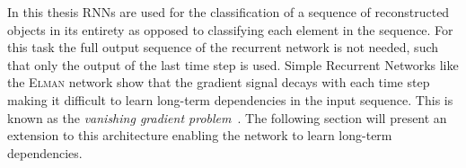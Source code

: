 In this thesis RNNs are used for the classification of a sequence of
reconstructed objects in its entirety as opposed to classifying each element in
the sequence. For this task the full output sequence of the recurrent network is
not needed, such that only the output of the last time step is used. Simple
Recurrent Networks like the \textsc{Elman} network show that the gradient signal
decays with each time step making it difficult to learn long-term dependencies
in the input sequence. This is known as the \emph{vanishing gradient
  problem}~\cite{hochreiter, lecun_bengio_hinton_DL}. The following section will
present an extension to this architecture enabling the network to learn
long-term dependencies.


